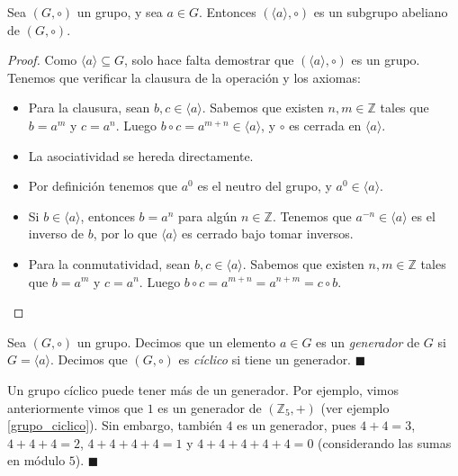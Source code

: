 \begin{proposition}\label{prop-generado}
	Sea $(G,\circ)$ un grupo, y sea $a \in G$. Entonces $(\langle a\rangle , \circ)$ es un subgrupo abeliano de $(G,\circ)$. 
\end{proposition} 


\begin{proof}
Como $\langle a\rangle\subseteq G$, solo hace falta demostrar
que $(\langle a\rangle,\circ)$ es un grupo. Tenemos que verificar la clausura de la operación y los axiomas:
\begin{itemize}
\item Para la clausura, sean $b,c \in \langle
a\rangle$. Sabemos que existen $n, m \in \mathbb{Z}$ tales que $b = a^m$ y $c = a^n$. Luego $b \circ c = a^{m+n} \in \langle a\rangle$, y $\circ$ es cerrada en $\langle a \rangle$.
\item La asociatividad se hereda directamente.
\item Por definición tenemos que $a^0$ es el neutro del grupo, y $a^0 \in \langle a \rangle$. 
\item Si $b \in \langle a \rangle$, entonces $b = a^n$ para algún $n \in \mathbb{Z}$. Tenemos que $a^{-n} \in \langle a \rangle$ es el inverso de $b$, por lo que $\langle a \rangle$ es cerrado bajo tomar inversos.
\item Para la conmutatividad, sean $b,c \in \langle
	a\rangle$. Sabemos que existen $n, m \in \mathbb{Z}$ tales que $b = a^m$ y $c = a^n$. Luego $b \circ c = a^{m + n} = a^{n + m} = c \circ b$.
\end{itemize}
\end{proof}

\begin{definition} 
Sea $(G, \circ)$ un grupo. Decimos que un elemento $a \in G$ es un \emph{generador} de $G$ si $G = \langle a \rangle$. Decimos que $(G, \circ)$ es \emph{cíclico} si tiene un generador.
\hfill$\blacksquare$
\end{definition}

\begin{remark}
Un grupo cíclico puede tener más de un generador. Por ejemplo, vimos anteriormente vimos que $1$ es un generador de $(\mathbb{Z}_5, +)$ (ver ejemplo \ref{grupo_ciclico}). Sin embargo, también $4$ es un generador, pues $4 + 4 = 3$, $4 + 4 + 4 = 2$, $4 + 4 + 4 + 4 = 1$ y $4 + 4 + 4 + 4 + 4 = 0$ (considerando las sumas en módulo $5$).
\hfill$\blacksquare$
\end{remark}

